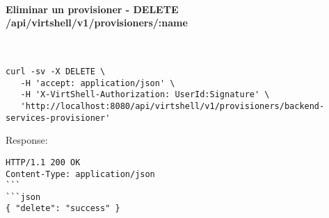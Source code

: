 \paragraph{Eliminar un provisioner - DELETE /api/virtshell/v1/provisioners/:name} ~\\

\begin{lstlisting}[style=json]
curl -sv -X DELETE \
   -H 'accept: application/json' \
   -H 'X-VirtShell-Authorization: UserId:Signature' \
   'http://localhost:8080/api/virtshell/v1/provisioners/backend-services-provisioner'
\end{lstlisting}

Response:

\begin{lstlisting}[style=json]
HTTP/1.1 200 OK
Content-Type: application/json
```
```json
{ "delete": "success" }
\end{lstlisting}